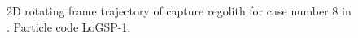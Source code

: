 \documentclass[print]{tudelft-report}
\begin{document}
\begin{appendices}
\begin{figure}[htb]
    \caption{2D rotating frame trajectory of capture regolith for case number 8 in . Particle code LoGSP-1.}
    \label{fig:LoGSP_1_capture_case_8_2d_traj_bodyFrame}
    \end{figure}
    \FloatBarrier
\end{appendices}
\end{document}
